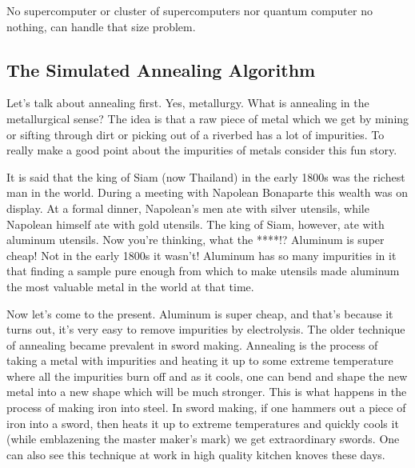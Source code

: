 \documentclass{article}
\theoremstyle{definition}
\theoremstyle{remark}
\begin{document}
No supercomputer or cluster of supercomputers nor quantum computer no nothing, can handle that size problem.


\subsection{The Simulated Annealing Algorithm}

Let's talk about annealing first.  Yes, metallurgy.  What is annealing in the metallurgical sense?  The idea is that a raw piece of metal which we get by mining or sifting through dirt or picking out of a riverbed has a lot of impurities. To really make a good point about the impurities of metals consider this fun story.

It is said that the king of Siam (now Thailand) in the early 1800s was the richest man in the world.  During a meeting with Napolean Bonaparte this wealth was on display.  At a formal dinner, Napolean's men ate with silver utensils, while Napolean himself ate with gold utensils.  The king of Siam, however, ate with aluminum utensils.  Now you're thinking, what the ****!? Aluminum is super cheap!  Not in the early 1800s it wasn't!  Aluminum has so many impurities in it that finding a sample pure enough from which to make utensils made aluminum the most valuable metal in the world at that time.  

Now let's come to the present.  Aluminum is super cheap, and that's because it turns out, it's very easy to remove impurities by electrolysis.  The older technique of annealing became prevalent in sword making.  Annealing is the process of taking a metal with impurities and heating it up to some extreme temperature where all the impurities burn off and as it cools, one can bend and shape the new metal into a new shape which will be much stronger.  This is what happens in the process of making iron into steel. In sword making, if one hammers out a piece of iron into a sword, then heats it up to extreme temperatures and quickly cools it (while emblazening the master maker's mark) we get extraordinary swords.  One can also see this technique at work in high quality kitchen knoves these days.  
\end{document}
